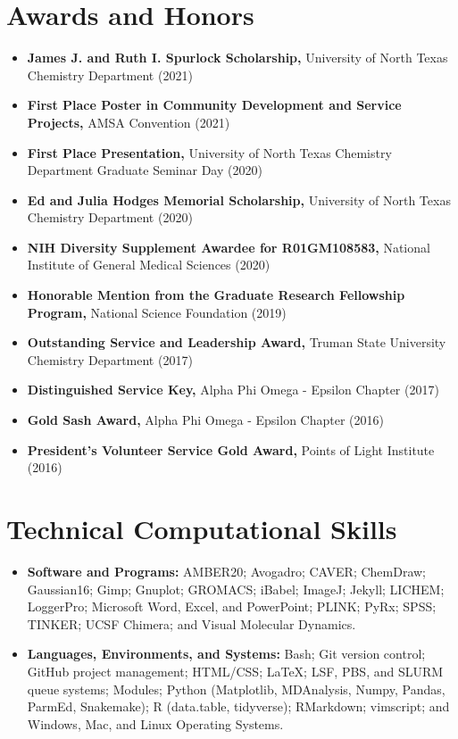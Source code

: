 \documentclass[letterpaper,11pt]{article}
\newcommand{\resumeItem}[2]{
  \item\small{
    \textbf{#1}{ #2 \vspace{-2pt}}
  }
}
\newcommand{\resumeSubItem}[2]{\resumeItem{#1}{#2}\vspace{-4pt}}
\newcommand{\resumeSubHeadingListStart}{\begin{itemize}[leftmargin=*]}
\newcommand{\resumeSubHeadingListEnd}{\end{itemize}}
\begin{document}
\section{Awards and Honors}
  \resumeSubHeadingListStart
   \resumeSubItem{James J. and Ruth I. Spurlock Scholarship\textnormal{,}}
      {University of North Texas Chemistry Department (2021)}
   \resumeSubItem{First Place Poster in Community Development and Service Projects\textnormal{,}}
      {AMSA Convention (2021)}
   \resumeSubItem{First Place Presentation\textnormal{,}}
      {University of North Texas Chemistry Department Graduate Seminar Day (2020)}
   \resumeSubItem{Ed and Julia Hodges Memorial Scholarship\textnormal{,}}
      {University of North Texas Chemistry Department (2020)}
   \resumeSubItem{NIH Diversity Supplement Awardee for R01GM108583\textnormal{,}}
      {National Institute of General Medical Sciences (2020)}
   \resumeSubItem{Honorable Mention from the Graduate Research Fellowship Program\textnormal{,}}
      {National Science Foundation (2019)}
    \resumeSubItem{Outstanding Service and Leadership Award\textnormal{,}}
      {Truman State University Chemistry Department (2017)}
    \resumeSubItem{Distinguished Service Key\textnormal{,}}
      {Alpha Phi Omega - Epsilon Chapter (2017)}
    \resumeSubItem{Gold Sash Award\textnormal{,}}
      {Alpha Phi Omega - Epsilon Chapter (2016)}
    \resumeSubItem{President's Volunteer Service Gold Award\textnormal{,}}
      {Points of Light Institute (2016)}
  \resumeSubHeadingListEnd

\newpage
{}
\fancyfoot[C]{\thepage}

\section{Technical Computational Skills}
  \resumeSubHeadingListStart
    \resumeSubItem{Software and Programs:}
      {AMBER20; Avogadro; CAVER; ChemDraw; Gaussian16; Gimp; Gnuplot; GROMACS; iBabel; ImageJ; Jekyll; LICHEM; LoggerPro; Microsoft Word, Excel, and PowerPoint; PLINK; PyRx; SPSS; TINKER; UCSF Chimera; and Visual Molecular Dynamics.}
      \resumeSubItem{Languages, Environments, and Systems:}
      {Bash; Git version control; GitHub project management; HTML/CSS; \LaTeX; LSF, PBS, and SLURM queue systems; Modules; Python (Matplotlib, MDAnalysis, Numpy, Pandas, ParmEd, Snakemake); R (data.table, tidyverse); RMarkdown; vimscript; and Windows, Mac, and Linux Operating Systems.}
\resumeSubHeadingListEnd
\end{document}
